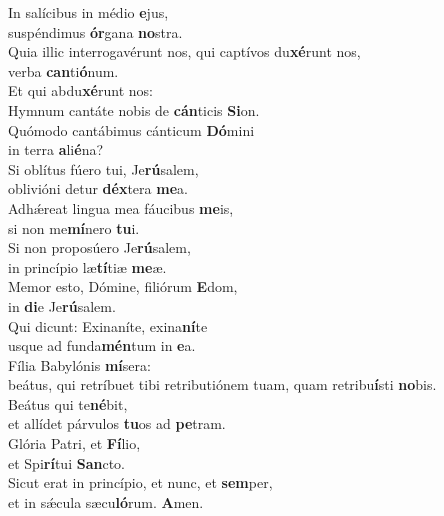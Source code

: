 \evenverse In salícibus in médio \textbf{e}jus,~\*\\
\evenverse suspéndimus \textbf{ór}gana \textbf{no}stra.\\
\oddverse Quia illic interrogavérunt nos, qui captívos du\textbf{xé}runt nos,~\*\\
\oddverse verba \textbf{can}ti\textbf{ó}num.\\
\evenverse Et qui abdu\textbf{xé}runt nos:~\*\\
\evenverse Hymnum cantáte nobis de \textbf{cán}ticis \textbf{Si}on.\\
\oddverse Quómodo cantábimus cánticum \textbf{Dó}mini~\*\\
\oddverse in terra \textbf{a}li\textbf{é}na?\\
\evenverse Si oblítus fúero tui, Je\textbf{rú}salem,~\*\\
\evenverse oblivióni detur \textbf{déx}tera \textbf{me}a.\\
\oddverse Adhǽreat lingua mea fáucibus \textbf{me}is,~\*\\
\oddverse si non me\textbf{mí}nero \textbf{tu}i.\\
\evenverse Si non proposúero Je\textbf{rú}salem,~\*\\
\evenverse in princípio læ\textbf{tí}tiæ \textbf{me}æ.\\
\oddverse Memor esto, Dómine, filiórum \textbf{E}dom,~\*\\
\oddverse in \textbf{di}e Je\textbf{rú}salem.\\
\evenverse Qui dicunt: Exinaníte, exina\textbf{ní}te~\*\\
\evenverse usque ad funda\textbf{mén}tum in \textbf{e}a.\\
\oddverse Fília Babylónis \textbf{mí}sera:~\*\\
\oddverse beátus, qui retríbuet tibi retributiónem tuam, quam retribu\textbf{í}sti \textbf{no}bis.\\
\evenverse Beátus qui te\textbf{né}bit,~\*\\
\evenverse et allídet párvulos \textbf{tu}os ad \textbf{pe}tram.\\
\oddverse Glória Patri, et \textbf{Fí}lio,~\*\\
\oddverse et Spi\textbf{rí}tui \textbf{San}cto.\\
\evenverse Sicut erat in princípio, et nunc, et \textbf{sem}per,~\*\\
\evenverse et in sǽcula sæcu\textbf{ló}rum. \textbf{A}men.\\
